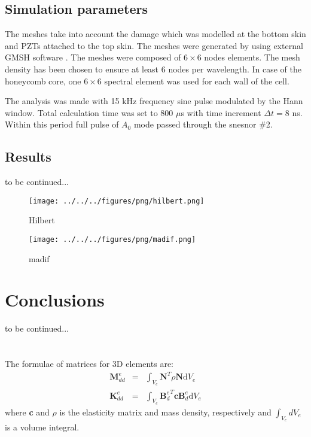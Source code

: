 \documentclass[a4paper,12pt]{article}
\newcommand{\rmd}{\mathrm{d}}
\begin{document}
\subsection{Simulation parameters}
\label{sec:simulation}
The meshes take into account the damage which was modelled at the bottom skin 
and PZTs attached to the top skin.
The meshes were generated by using external GMSH software 
\cite{geuzaine2009gmsh}.
The meshes were composed of $6 \times 6$ nodes elements.
The mesh density has been chosen to ensure at least 6 nodes per wavelength.
In case of the honeycomb core, one $6 \times 6$ spectral element was used for 
each wall of the cell.

The analysis was made with 15 kHz frequency sine pulse modulated by the Hann 
window.
Total calculation time was set to 800 $\mu$s with time increment $\Delta t=8$ 
ns.
Within this period full pulse of $A_0$ mode passed through the snesnor \#2.
\subsection{Results}
\label{sec:results}
to be continued...
\begin{figure}
	\begin{center}
		\texttt{[image: ../../../figures/png/hilbert.png]}
	\end{center}
	\caption{Hilbert}
	\label{fig:hilbert}
\end{figure}
\begin{figure}
	\begin{center}
		\texttt{[image: ../../../figures/png/madif.png]}
	\end{center}
	\caption{madif}
	\label{fig:madif}
\end{figure}
\section{Conclusions}
to be continued...
\appendix
\section{}
\label{app:matrices}
The formulae of matrices for 3D elements are:
\begin{eqnarray}
\textbf{M}_{dd}^e & = & \int_{V_e}\textbf{N}^T\rho \textbf{N}\rmd V_e\\
\textbf{K}_{dd}^e & = & \int_{V_e}{\textbf{B}_d^e}^T\textbf{c}\textbf{B}_d^e\rmd V_e
\end{eqnarray}
where \textbf{c} and $\rho$ is the elasticity matrix and mass density, respectively and $\int_{V_e}dV_e$ is a volume integral.
\end{document}

